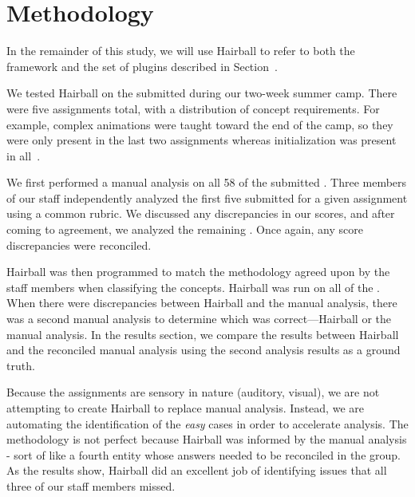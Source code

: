 \section{Methodology} 
In the remainder of this study, we will use Hairball to refer to both the
framework and the set of plugins described in Section~.

We tested Hairball on the  submitted during our two-week summer
camp.  There were five assignments total, with a distribution of concept
requirements. For example, complex animations were taught toward the end of the
camp, so they were only present in the last two assignments whereas
initialization was present in all~\cite{Franklin:2013:SBO}.

We first performed a manual analysis on all 58 of the submitted .
Three members of our staff independently analyzed the first five 
submitted for a given assignment using a common rubric. We discussed any
discrepancies in our scores, and after coming to agreement, we analyzed the
remaining .  Once again, any score discrepancies were reconciled.

Hairball was then programmed to match the methodology agreed upon by the staff
members when classifying the concepts.  Hairball was run on all of the
.  When there were discrepancies between Hairball and the manual
analysis, there was a second manual analysis to determine which was
correct---Hairball or the manual analysis.  In the results section, we compare
the results between Hairball and the reconciled manual analysis using the
second analysis results as a ground truth.

Because the assignments are sensory in nature (auditory, visual), we are not
attempting to create Hairball to replace manual analysis.  Instead, we are
automating the identification of the \emph{easy} cases in order to accelerate
analysis.  The methodology is not perfect because Hairball was informed by the
manual analysis - sort of like a fourth entity whose answers needed to be
reconciled in the group.  As the results show, Hairball did an excellent job of
identifying issues that all three of our staff members missed.
